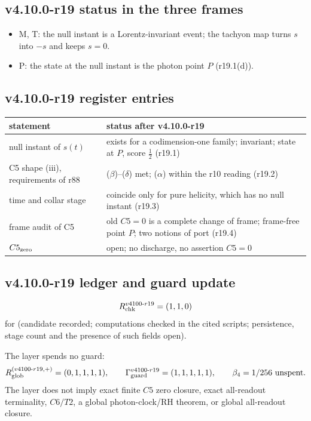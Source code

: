 \subsection*{v4.10.0-r19 status in the three frames}
\label{subsec:v4100-r19-frames}

\begin{itemize}[leftmargin=2em]
\item M, T: the null instant is a Lorentz-invariant event; the tachyon map turns \(s\) into \(-s\) and keeps \(s=0\).
\item P: the state at the null instant is the photon point \(P\) (r19.1(d)).
\end{itemize}

\subsection*{v4.10.0-r19 register entries}
\label{subsec:v4100-r19-register}

\begin{center}
\small
\begin{tabular}{@{}>{\raggedright\arraybackslash}p{}>{\raggedright\arraybackslash}p{}@{}}
\toprule
statement & status after v4.10.0-r19\\
\midrule
null instant of \(s(t)\) & exists for a codimension-one family; invariant; state at \(P\), score \(\tfrac12\) (r19.1)\\
C5 shape (iii), requirements of r88 & (\(\beta\))--(\(\delta\)) met; (\(\alpha\)) within the r10 reading (r19.2)\\
time and collar stage & coincide only for pure helicity, which has no null instant (r19.3)\\
frame audit of C5 & old \(C5=0\) is a complete change of frame; frame-free point \(P\); two notions of port (r19.4)\\
\(C5_{\rm zero}\) & open; no discharge, no assertion \(C5=0\)\\
\bottomrule
\end{tabular}
\end{center}

\subsection*{v4.10.0-r19 ledger and guard update}
\label{subsec:v4100-r19-ledger-guard}

\[
R_{\rm chk}^{v4100\text{-}r19}=(1,1,0)
\]
for (candidate recorded; computations checked in the cited scripts; persistence, stage count and the presence of such fields open).

The layer spends no guard:
\[
R_{\rm glob}^{(v4100\text{-}r19,+)}=(0,1,1,1,1),
\qquad
\Gamma_{\rm guard}^{v4100\text{-}r19}=(1,1,1,1,1),
\qquad
\beta_4=1/256\ \text{unspent}.
\]
The layer does not imply exact finite \(C5\) zero closure, exact all-readout terminality, \(C6/T2\), a global photon-clock/RH theorem,
or global all-readout closure.
